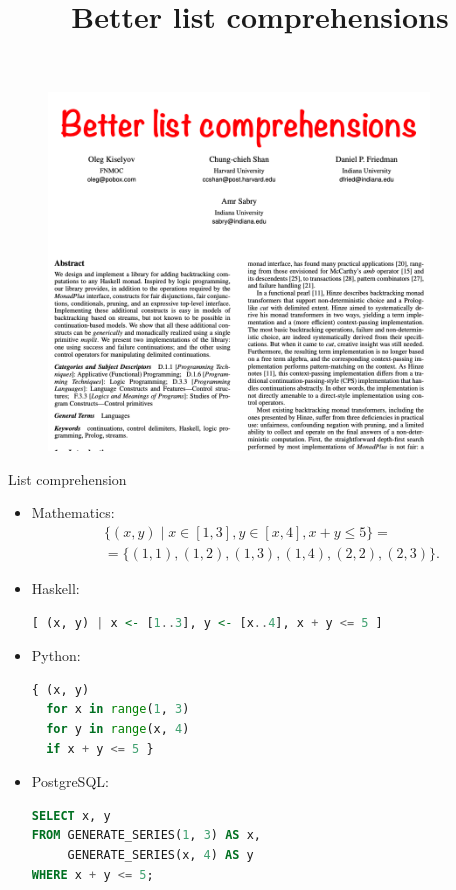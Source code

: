 \documentclass[handout]{beamer}
\begin{document}
\title{Better list comprehensions}

\begin{frame}
\begin{figure}[H]
\centering
\includegraphics[width=0.9\textwidth]{better-list-comprehensions.png}
\end{figure}
\end{frame}


\begin{frame}[fragile]{List comprehension}

\vspace{-1.4ex}

\begin{itemize}[<+->]

\item Mathematics:
\begin{multline*}
\{ (x, y) \mid x \in [1,3], y \in [x,4], x + y \le 5 \}
= \\ =
\{ (1, 1), (1, 2), (1, 3), (1, 4), (2, 2), (2, 3) \}.
\end{multline*}

\item Haskell:
\begin{lstlisting}[language=Haskell]
[ (x, y) | x <- [1..3], y <- [x..4], x + y <= 5 ]
\end{lstlisting}

\item Python:
\begin{lstlisting}[language=Python]
{ (x, y)
  for x in range(1, 3)
  for y in range(x, 4)
  if x + y <= 5 }
\end{lstlisting}

\item PostgreSQL:
\begin{lstlisting}[language=SQL]
SELECT x, y
FROM GENERATE_SERIES(1, 3) AS x,
     GENERATE_SERIES(x, 4) AS y
WHERE x + y <= 5;
\end{lstlisting}

\end{itemize}

\end{frame}
\end{document}
